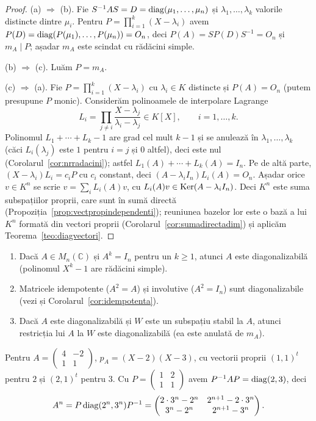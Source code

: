 \begin{proof}
(a) $\Rightarrow$ (b). Fie $S^{-1}AS=D=\operatorname{diag}(\mu_1,\dots,\mu_n)$ și $\lambda_1,\dots,\lambda_k$ valorile distincte dintre $\mu_i$. Pentru $P=\prod_{i=1}^k(X-\lambda_i)$ avem $P(D)=\operatorname{diag}(P(\mu_1),\dots,P(\mu_n))=O_n$, deci $P(A)=SP(D)S^{-1}=O_n$ și $m_A\mid P$; așadar $m_A$ este scindat cu rădăcini simple.

(b) $\Rightarrow$ (c). Luăm $P=m_A$.

(c) $\Rightarrow$ (a). Fie $P=\prod_{i=1}^k(X-\lambda_i)$ cu $\lambda_i\in K$ distincte și $P(A)=O_n$ (putem presupune $P$ monic). Considerăm polinoamele de interpolare Lagrange
\[
L_i=\prod_{j\ne i}\frac{X-\lambda_j}{\lambda_i-\lambda_j}\in K[X],\qquad i=1,\dots,k .
\]
Polinomul $L_1+\cdots+L_k-1$ are grad cel mult $k-1$ și se anulează în $\lambda_1,\dots,\lambda_k$ (căci $L_i(\lambda_j)$ este $1$ pentru $i=j$ și $0$ altfel), deci este nul (Corolarul~\ref{cor:nrradacini}); astfel $L_1(A)+\cdots+L_k(A)=I_n$. Pe de altă parte, $(X-\lambda_i)L_i=c_iP$ cu $c_i$ constant, deci $(A-\lambda_iI_n)L_i(A)=O_n$. Așadar orice $v\in K^n$ se scrie $v=\sum_iL_i(A)v$, cu $L_i(A)v\in\operatorname{Ker}(A-\lambda_iI_n)$. Deci $K^n$ este suma subspațiilor proprii, care sunt în sumă directă (Propoziția~\ref{prop:vectpropindependenti}); reuniunea bazelor lor este o bază a lui $K^n$ formată din vectori proprii (Corolarul~\ref{cor:sumadirectadim}) și aplicăm Teorema~\ref{teo:diagvectori}.
\end{proof}

\begin{corolar}\label{cor:diagexemple}
\begin{enumerate}
\item Dacă $A\in M_n(\mathbb{C})$ și $A^k=I_n$ pentru un $k\ge1$, atunci $A$ este diagonalizabilă (polinomul $X^k-1$ are rădăcini simple).
\item Matricele idempotente ($A^2=A$) și involutive ($A^2=I_n$) sunt diagonalizabile (vezi și Corolarul~\ref{cor:idempotenta}).
\item Dacă $A$ este diagonalizabilă și $W$ este un subspațiu stabil la $A$, atunci restricția lui $A$ la $W$ este diagonalizabilă (ea este anulată de $m_A$).
\end{enumerate}
\end{corolar}

\begin{exemplu}
Pentru $A=\begin{pmatrix}4&-2\\1&1\end{pmatrix}$, $p_A=(X-2)(X-3)$, cu vectorii proprii $(1,1)^t$ pentru $2$ și $(2,1)^t$ pentru $3$. Cu $P=\begin{pmatrix}1&2\\1&1\end{pmatrix}$ avem $P^{-1}AP=\operatorname{diag}(2,3)$, deci
\[
A^n=P\operatorname{diag}(2^n,3^n)P^{-1}=\begin{pmatrix}2\cdot3^n-2^n&2^{n+1}-2\cdot3^n\\3^n-2^n&2^{n+1}-3^n\end{pmatrix}.
\]
\end{exemplu}

